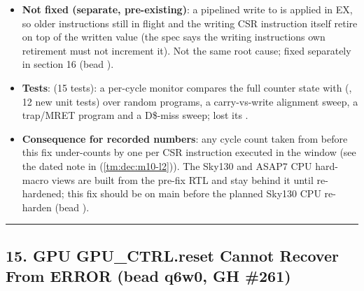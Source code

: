 \begin{record}
\begin{itemize}
  \textbf{Which counters were actually affected on the unfixed RTL}:
   (every CSR instruction),  (D\$ miss
  pulse can coincide), and / in
  trap-entry/\allowbreak{}MRET cycles. The retire strobe, I\$ miss pulse
  and redirect pulse never share a cycle with an ordinary CSR in EX in
  this pipeline (instruction EX spacing is \textgreater= 3 cycles;
  retire trails EX by 2), so for those the CSR-in-EX freeze was latent.
\item
  \textbf{Not fixed (separate, pre-existing)}: a pipelined write to
   is applied in EX, so older instructions still in
  flight and the writing CSR instruction itself retire on top of the
  written value (the spec says the writing instruction\textquotesingle s
  own retirement must not increment it). Not the same root cause; fixed
  separately in section 16 (bead ).
\item
  \textbf{Tests}:  (15 tests): a
  per-cycle monitor compares the full counter state with
   (, 12 new unit
  tests) over random programs, a carry-vs-write alignment sweep, a
  trap/MRET program and a D\$-miss sweep;
   lost its
  .
\item
  \textbf{Consequence for recorded numbers}: any cycle count taken from
   before this fix under-counts by one per CSR instruction
  executed in the window (see the dated note in
   (\cref{tm:dec:m10-l2})). The Sky130 and ASAP7 CPU
  hard-macro views are built from the pre-fix RTL and stay behind it
  until re-hardened; this fix should be on main before the planned
  Sky130 CPU re-harden (bead ).
\end{itemize}

\begin{center}\rule{0.5\linewidth}{0.5pt}\end{center}

\end{record}

\subsection{\texorpdfstring{15. GPU GPU\_\allowbreak{}CTRL.reset Cannot
Recover From ERROR (bead q6w0, GH
\#261)}{15. GPU GPU\_CTRL.reset Cannot Recover From ERROR (bead q6w0, GH \#261)}}\label{cr:fix:fixes-index:15-gpu-gpu-ctrlreset-cannot-recover-from-error-bead-q6w0-gh-261}

